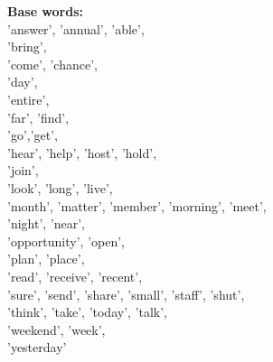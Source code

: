 \documentclass[../embeddings.tex]{subfiles}
\begin{document}
\textbf{Base words:}\\
    'answer', 'annual', 'able',\\
    'bring',\\
    'come', 'chance',\\
    'day',\\
    'entire',\\
    'far', 'find',\\
    'go','get',\\
    'hear', 'help', 'host', 'hold',\\
    'join',\\
    'look', 'long', 'live',\\
    'month', 'matter', 'member', 'morning', 'meet',\\
    'night', 'near',\\
    'opportunity', 'open',\\
    'plan', 'place',\\
    'read', 'receive', 'recent',\\
    'sure', 'send', 'share', 'small', 'staff', 'shut',\\
    'think', 'take', 'today', 'talk',\\
    'weekend', 'week',\\
    'yesterday'
\end{document}
